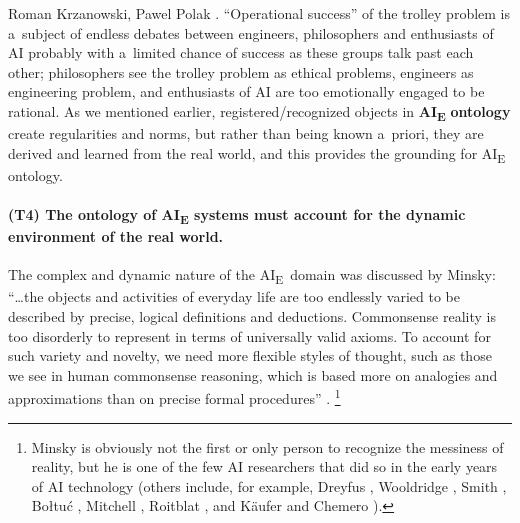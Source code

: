 \begin{artengenv2auth}{Roman Krzanowski, Pawel Polak}
\parencite[see e.g.,][]{cathcart_trolley_2013}. %
 ``Operational success'' of the trolley problem is a~subject of endless debates between engineers, philosophers and enthusiasts of AI probably with a~limited chance of success as these groups talk past each other; philosophers see the trolley problem as ethical problems, engineers as engineering problem, and enthusiasts of AI are too emotionally engaged to be rational. As we mentioned earlier, registered/recognized objects in \textbf{AI}\textbf{\textsubscript{E}} \textbf{ontology} create regularities and norms, but rather than being known a~priori, they are derived and learned from the real world, and this provides the grounding for AI\textsubscript{E} ontology.

\paragraph{(T4) The ontology of AI\textsubscript{E} systems must account for the dynamic environment of the real world.}
The complex and dynamic nature of the AI\textsubscript{E}~domain was discussed by Minsky: ``\ldots the objects and activities of everyday life are too endlessly varied to be described by precise, logical definitions and deductions. Commonsense reality is too disorderly to represent in terms of universally valid axioms. To account for such variety and novelty, we need more flexible styles of thought, such as those we see in human commonsense reasoning, which is based more on analogies and approximations than on precise formal procedures''
\parencite[][p.6]{minsky_logical_1991}.%
\footnote{Minsky is obviously not the first or only person to recognize the messiness of reality, but he is one of the few AI researchers that did so in the early years of AI technology (others include, for example, Dreyfus 
\parencite*[][]{dreyfus_skillful_2016}, %
 Wooldridge 
\parencite*[][]{wooldridge_road_2021}, %
 Smith 
\parencite*[][]{smith_promise_2019}, %
 Bołtuć 
\parencite*[][]{boltuc_conscious_2020}, %
 Mitchell 
\parencite*[][]{mitchell_artificial_2019}, %
 Roitblat 
\parencite*[][]{roitblat_algorithms_2020}, %
 and Käufer and Chemero 
\parencite*[][]{kaufer_phenomenology_2021}%
).}


\end{artengenv2auth}
